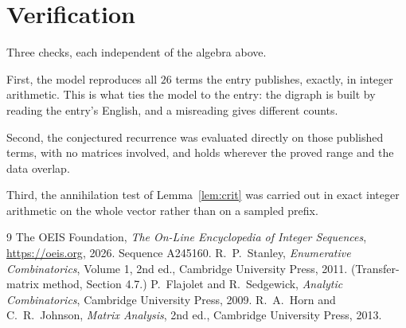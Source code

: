 \documentclass[11pt,a4paper]{article}
\theoremstyle{plain}
\theoremstyle{definition}
\begin{document}
\section{Verification}

Three checks, each independent of the algebra above.

First, the model reproduces all $26$ terms the entry publishes, exactly, in integer
arithmetic. This is what ties the model to the entry: the digraph is built by reading the
entry's English, and a misreading gives different counts.

Second, the conjectured recurrence was evaluated directly on those published terms, with no
matrices involved, and holds wherever the proved range and the data overlap.

Third, the annihilation test of Lemma~\ref{lem:crit} was carried out in exact integer
arithmetic on the whole vector rather than on a sampled prefix.

\begin{thebibliography}{9}
 The OEIS Foundation, \emph{The On-Line Encyclopedia of Integer
Sequences}, \url{https://oeis.org}, 2026. Sequence A245160.
 R.~P.~Stanley, \emph{Enumerative Combinatorics}, Volume 1, 2nd ed.,
Cambridge University Press, 2011. (Transfer-matrix method, Section 4.7.)
 P.~Flajolet and R.~Sedgewick, \emph{Analytic Combinatorics}, Cambridge
University Press, 2009.
 R.~A.~Horn and C.~R.~Johnson, \emph{Matrix Analysis}, 2nd ed., Cambridge
University Press, 2013.
\end{thebibliography}
\end{document}
